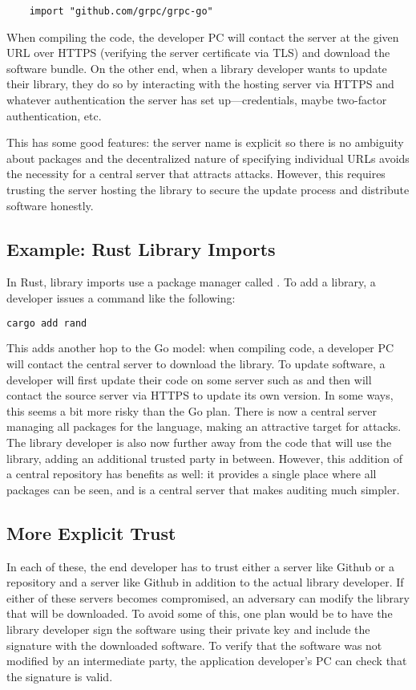 \begin{lstlisting}	
	import "github.com/grpc/grpc-go"
\end{lstlisting}

When compiling the code, the developer PC will contact the server at the given URL over HTTPS (verifying the server certificate via TLS) and download the software bundle. On the other end, when a library developer wants to update their library, they do so by interacting with the hosting server via HTTPS and whatever authentication the server has set up---credentials, maybe two-factor authentication, etc.

This has some good features: the server name is explicit so there is no ambiguity about packages and the decentralized nature of specifying individual URLs avoids the necessity for a central server that attracts attacks. However, this requires trusting the server hosting the library to secure the update process and distribute software honestly.

\subsection{Example: Rust Library Imports}
In Rust, library imports use a package manager called . To add a library, a developer issues a command like the following:

\begin{lstlisting}[language=sh]
	cargo add rand
\end{lstlisting}

This adds another hop to the Go model: when compiling code, a developer PC will contact the central server  to download the library. To update software, a developer will first update their code on some server such as  and then  will contact the source server via HTTPS to update its own version. In some ways, this seems a bit more risky than the Go plan. There is now a central server managing all packages for the language, making an attractive target for attacks. The library developer is also now further away from the code that will use the library, adding an additional trusted party in between. However, this addition of a central repository has benefits as well: it provides a single place where all packages can be seen, and is a central server that makes auditing much simpler.

\subsection{More Explicit Trust}
In each of these, the end developer has to trust either a server like Github or a repository and a server like Github in addition to the actual library developer. If either of these servers becomes compromised, an adversary can modify the library that will be downloaded. To avoid some of this, one plan would be to have the library developer sign the software using their private key and include the signature with the downloaded software. To verify that the software was not modified by an intermediate party, the application developer's PC can check that the signature is valid. 

